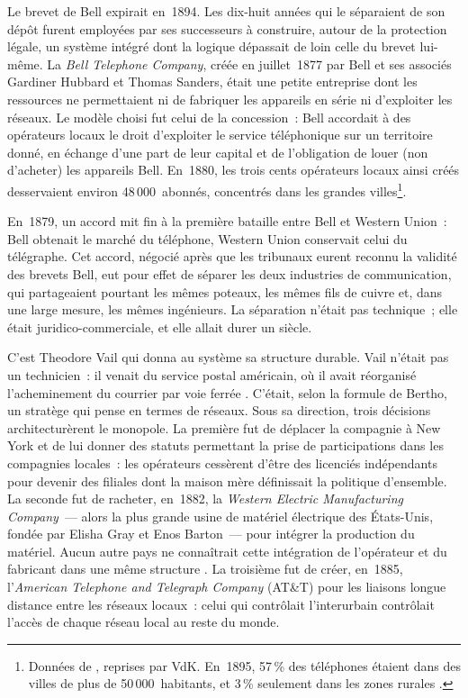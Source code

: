 Le brevet de Bell expirait en~1894. Les dix-huit années qui le séparaient de son dépôt furent employées par ses successeurs à construire, autour de la protection légale, un système intégré dont la logique dépassait de loin celle du brevet lui-même. La \emph{Bell Telephone Company}, créée en juillet~1877 par Bell et ses associés Gardiner Hubbard et Thomas Sanders, était une petite entreprise dont les ressources ne permettaient ni de fabriquer les appareils en série ni d'exploiter les réseaux. Le modèle choisi fut celui de la concession~: Bell accordait à des opérateurs locaux le droit d'exploiter le service téléphonique sur un territoire donné, en échange d'une part de leur capital et de l'obligation de louer (non d'acheter) les appareils Bell. En~1880, les trois cents opérateurs locaux ainsi créés desservaient environ 48\,000~abonnés, concentrés dans les grandes villes\footnote{Données de \textcite{joel_history_1975}, reprises par VdK. En~1895, 57\,\% des téléphones étaient dans des villes de plus de 50\,000~habitants, et 3\,\% seulement dans les zones rurales \parencite{mueller_universal_1993}.}.

%
En~1879, un accord mit fin à la première bataille entre Bell et Western Union~: Bell obtenait le marché du téléphone, Western Union conservait celui du télégraphe. Cet accord, négocié après que les tribunaux eurent reconnu la validité des brevets Bell, eut pour effet de séparer les deux industries de communication, qui partageaient pourtant les mêmes poteaux, les mêmes fils de cuivre et, dans une large mesure, les mêmes ingénieurs. La séparation n'était pas technique~; elle était juridico-commerciale, et elle allait durer un siècle.

C'est Theodore Vail qui donna au système sa structure durable. Vail n'était pas un technicien~: il venait du service postal américain, où il avait réorganisé l'acheminement du courrier par voie ferrée \parencite{bertho_histoire_1984}. C'était, selon la formule de Bertho, \og un stratège qui pense en termes de réseaux\fg{}. Sous sa direction, trois décisions architecturèrent le monopole. La première fut de déplacer la compagnie à New York et de lui donner des statuts permettant la prise de participations dans les compagnies locales~: les opérateurs cessèrent d'être des licenciés indépendants pour devenir des filiales dont la maison mère définissait la politique d'ensemble. La seconde fut de racheter, en~1882, la \emph{Western Electric Manufacturing Company}~--- alors la plus grande usine de matériel électrique des États-Unis, fondée par Elisha Gray et Enos Barton~--- pour intégrer la production du matériel. Aucun autre pays ne connaîtrait cette intégration de l'opérateur et du fabricant dans une même structure \parencite{bertho_histoire_1984}. La troisième fut de créer, en~1885, l'\emph{American Telephone and Telegraph Company} (AT\&T) pour les liaisons longue distance entre les réseaux locaux~: celui qui contrôlait l'interurbain contrôlait l'accès de chaque réseau local au reste du monde.

